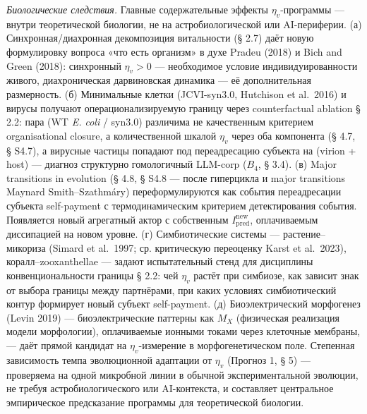 \documentclass[pdflatex,sn-mathphys-ay]{sn-jnl}
\begin{document}
\emph{Биологические следствия.} Главные содержательные эффекты \(\eta_v\)-программы --- внутри теоретической биологии, не на астробиологической или AI-периферии. (а) Синхронная/диахронная декомпозиция витальности (§ 2.7) даёт новую формулировку вопроса «что есть организм» в духе Pradeu (2018) и Bich and Green (2018): синхронный \(\eta_v > 0\) --- необходимое условие индивидуированности живого, диахроническая дарвиновская динамика --- её дополнительная размерность. (б) Минимальные клетки (JCVI-syn3.0, Hutchison et al.~2016) и вирусы получают операционализируемую границу через counterfactual ablation § 2.2: пара (WT \emph{E. coli} / syn3.0) различима не качественным критерием organisational closure, а количественной шкалой \(\eta_v\) через оба компонента (§ 4.7, § S4.7), а вирусные частицы попадают под переадресацию субъекта на (virion + host) --- диагноз структурно гомологичный LLM-corp (\(B_4\), § 3.4). (в) Major transitions in evolution (§ 4.8, § S4.8 --- после гиперцикла и major transitions Maynard Smith--Szathmáry) переформулируются как события переадресации субъекта self-payment с термодинамическим критерием детектирования события. Появляется новый агрегатный актор с собственным \(I_{\text{pred}}^{\text{new}}\), оплачиваемым диссипацией на новом уровне. (г) Симбиотические системы --- растение--микориза (Simard et al.~1997; ср. критическую переоценку Karst et al.~2023), коралл--zooxanthellae --- задают испытательный стенд для дисциплины конвенциональности границы § 2.2: чей \(\eta_v\) растёт при симбиозе, как зависит знак от выбора границы между партнёрами, при каких условиях симбиотический контур формирует новый субъект self-payment. (д) Биоэлектрический морфогенез (Levin 2019) --- биоэлектрические паттерны как \(M_X\) (физическая реализация модели морфологии), оплачиваемые ионными токами через клеточные мембраны, --- даёт прямой кандидат на \(\eta_v\)-измерение в морфогенетическом поле. Степенная зависимость темпа эволюционной адаптации от \(\eta_v\) (Прогноз 1, § 5) --- проверяема на одной микробной линии в обычной экспериментальной эволюции, не требуя астробиологического или AI-контекста, и составляет центральное эмпирическое предсказание программы для теоретической биологии.
\end{document}
